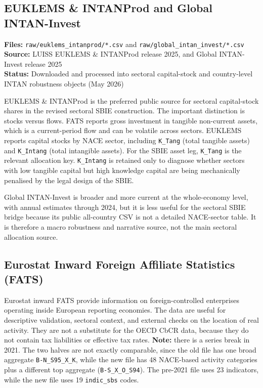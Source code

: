 \documentclass[11pt,a4paper]{article}
\newcommand{\code}[1]{\texttt{#1}}
\begin{document}
\subsection{EUKLEMS \& INTANProd and Global INTAN-Invest}\label{sec:euklems_intan}

\textbf{Files:} \texttt{raw/euklems\_intanprod/*.csv} and \texttt{raw/global\_intan\_invest/*.csv}\\
\textbf{Source:} LUISS EUKLEMS \& INTANProd release 2025, and Global INTAN-Invest release 2025 \citep{euklemsintanprod2025,globalintaninvest2025}\\
\textbf{Status:} Downloaded and processed into sectoral capital-stock and country-level INTAN robustness objects (May 2026)

EUKLEMS \& INTANProd is the preferred public source for sectoral capital-stock shares in the revised sectoral SBIE construction. The important distinction is stocks versus flows. FATS reports gross investment in tangible non-current assets, which is a current-period flow and can be volatile across sectors. EUKLEMS reports capital stocks by NACE sector, including \code{K\_Tang} (total tangible assets) and \code{K\_Intang} (total intangible assets). For the SBIE asset leg, \code{K\_Tang} is the relevant allocation key. \code{K\_Intang} is retained only to diagnose whether sectors with low tangible capital but high knowledge capital are being mechanically penalised by the legal design of the SBIE.

Global INTAN-Invest is broader and more current at the whole-economy level, with annual estimates through 2024, but it is less useful for the sectoral SBIE bridge because its public all-country CSV is not a detailed NACE-sector table. It is therefore a macro robustness and narrative source, not the main sectoral allocation source.

\subsection{Eurostat Inward Foreign Affiliate Statistics (FATS)}\label{sec:fats}

Eurostat inward FATS provide information on foreign-controlled enterprises operating inside European reporting economies. The data are useful for descriptive validation, sectoral context, and external checks on the location of real activity. They are not a substitute for the OECD CbCR data, because they do not contain tax liabilities or effective tax rates. \textbf{Note:} there is a series break in 2021. The two halves are not exactly comparable, since the old file has one broad aggregate \texttt{B-N\_S95\_X\_K}, while the new file has 48 NACE-based activity categories plus a different top aggregate (\texttt{B-S\_X\_O\_S94}). The pre-2021 file uses 23 indicators, while the new file uses 19 \texttt{indic\_sbs} codes.
\end{document}
